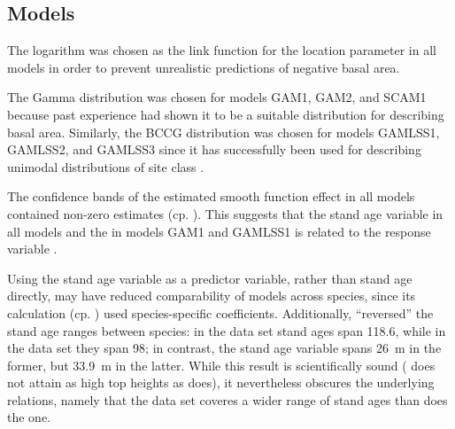 \subsection{Models}

The logarithm was chosen as the link function for the location parameter in all models in order to prevent unrealistic predictions of negative basal area.

The Gamma distribution was chosen for models GAM1, GAM2, and SCAM1 because past experience had shown it to be a suitable distribution for describing basal area.  Similarly, the BCCG distribution was chosen for models GAMLSS1, GAMLSS2, and GAMLSS3 since it has successfully been used for describing unimodal distributions of site class \parencite{Woerdehoff2016,Albert2009}.

The confidence bands of the estimated smooth function effect in all models contained non-zero estimates (cp. ).  This suggests that the stand age variable in all models and the \ProductivityIndexVariableText{} in models GAM1 and GAMLSS1 is related to the response variable \parencite{Wood2001}.

Using the stand age variable as a predictor variable, rather than stand age directly, may have reduced comparability of models across species, since its calculation (cp. ) used species-specific coefficients. Additionally,  ``reversed'' the stand age ranges between species:  in the \Beech{} data set stand ages span \SI{118.6}{\year}, while in the \Spruce{} data set they span \SI{98}{\year};  in contrast, the stand age variable spans \SI{26}{\meter} in the former, but \SI{33.9}{\meter} in the latter.  While this result is scientifically sound (\Beech{} does not attain as high top heights as \Spruce{} does), it nevertheless obscures the underlying relations, namely that the \Beech{} data set coveres a wider range of stand ages than does the \Spruce{} one.

